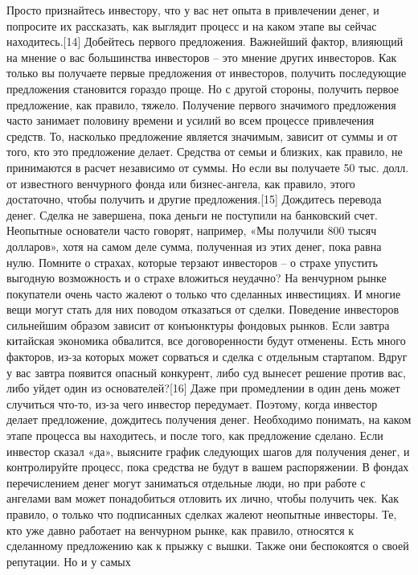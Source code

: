 \documentclass[ebook,12pt,oneside,openany]{memoir}
\begin{document}
Просто признайтесь инвестору, что у вас нет опыта в привлечении денег,
и попросите их рассказать, как выглядит процесс и на каком этапе вы
сейчас находитесь.[14] Добейтесь первого предложения. Важнейший
фактор, влияющий на мнение о вас большинства инвесторов – это мнение
других инвесторов. Как только вы получаете первые предложения от
инвесторов, получить последующие предложения становится гораздо проще.
Но с другой стороны, получить первое предложение, как правило, тяжело.
Получение первого значимого предложения часто занимает половину
времени и усилий во всем процессе привлечения средств. То, насколько
предложение является значимым, зависит от суммы и от того, кто это
предложение делает. Средства от семьи и близких, как правило, не
принимаются в расчет независимо от суммы. Но если вы получаете 50 тыс.
долл. от известного венчурного фонда или бизнес-ангела, как правило,
этого достаточно, чтобы получить и другие предложения.[15] Дождитесь
перевода денег. Сделка не завершена, пока деньги не поступили на
банковский счет. Неопытные основатели часто говорят, например, «Мы
получили 800 тысяч долларов», хотя на самом деле сумма, полученная из
этих денег, пока равна нулю. Помните о страхах, которые терзают
инвесторов – о страхе упустить выгодную возможность и о страхе
вложиться неудачно? На венчурном рынке покупатели очень часто жалеют о
только что сделанных инвестициях. И многие вещи могут стать для них
поводом отказаться от сделки. Поведение инвесторов сильнейшим образом
зависит от конъюнктуры фондовых рынков. Если завтра китайская
экономика обвалится, все договоренности будут отменены. Есть много
факторов, из-за которых может сорваться и сделка с отдельным
стартапом. Вдруг у вас завтра появится опасный конкурент, либо суд
вынесет решение против вас, либо уйдет один из основателей?[16] Даже
при промедлении в один день может случиться что-то, из-за чего
инвестор передумает. Поэтому, когда инвестор делает предложение,
дождитесь получения денег. Необходимо понимать, на каком этапе
процесса вы находитесь, и после того, как предложение сделано. Если
инвестор сказал «да», выясните график следующих шагов для получения
денег, и контролируйте процесс, пока средства не будут в вашем
распоряжении. В фондах перечислением денег могут заниматься отдельные
люди, но при работе с ангелами вам может понадобиться отловить их
лично, чтобы получить чек. Как правило, о только что подписанных
сделках жалеют неопытные инвесторы. Те, кто уже давно работает на
венчурном рынке, как правило, относятся к сделанному предложению как к
прыжку с вышки. Также они беспокоятся о своей репутации. Но и у самых
\end{document}
